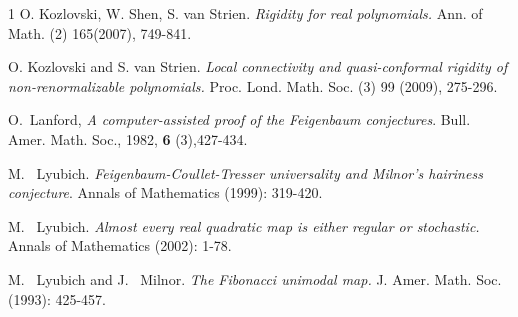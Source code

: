 \documentclass{amsart}
\numberwithin{equation}{section}
\theoremstyle{definition}
\theoremstyle{remark}
\begin{document}
\begin{thebibliography}{1}
 O. Kozlovski, W. Shen, S. van Strien. {\em Rigidity for real polynomials.} Ann. of Math. (2) 165(2007), 749-841.

 O. Kozlovski and S. van Strien. {\em Local connectivity and quasi-conformal rigidity of non-renormalizable polynomials.} Proc. Lond. Math. Soc. (3) 99 (2009), 275-296.

 O.\ Lanford, {\em A computer-assisted proof of the Feigenbaum conjectures}. Bull. Amer. Math. Soc., 1982, {\bf 6} (3),427-434.


M. \ Lyubich. {\em Feigenbaum-Coullet-Tresser universality and Milnor's hairiness conjecture}.  Annals of Mathematics (1999): 319-420.

M. \ Lyubich. {\em  Almost every real quadratic map is either regular or stochastic.}  Annals of Mathematics (2002): 1-78.


 M. \ Lyubich and J. \ Milnor. {\em The {F}ibonacci unimodal map.}
J. Amer. Math. Soc. (1993): 425-457.



\end{thebibliography}
\end{document}
